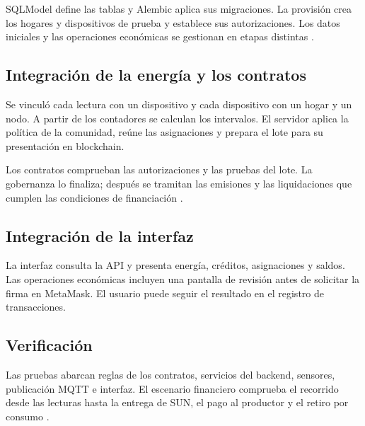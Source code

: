 SQLModel define las tablas y Alembic aplica sus migraciones. La provisión crea los hogares y dispositivos de prueba y establece sus autorizaciones. Los datos iniciales y las operaciones económicas se gestionan en etapas distintas \citep{models,database}.

\subsection{Integración de la energía y los contratos}
Se vinculó cada lectura con un dispositivo y cada dispositivo con un hogar y un nodo. A partir de los contadores se calculan los intervalos. El servidor aplica la política de la comunidad, reúne las asignaciones y prepara el lote para su presentación en blockchain.

Los contratos comprueban las autorizaciones y las pruebas del lote. La gobernanza lo finaliza; después se tramitan las emisiones y las liquidaciones que cumplen las condiciones de financiación \citep{settlement,contracts}.

\subsection{Integración de la interfaz}
La interfaz consulta la API y presenta energía, créditos, asignaciones y saldos. Las operaciones económicas incluyen una pantalla de revisión antes de solicitar la firma en MetaMask. El usuario puede seguir el resultado en el registro de transacciones.

\subsection{Verificación}
Las pruebas abarcan reglas de los contratos, servicios del backend, sensores, publicación MQTT e interfaz. El escenario financiero comprueba el recorrido desde las lecturas hasta la entrega de SUN, el pago al productor y el retiro por consumo \citep{verification,scenario}.
